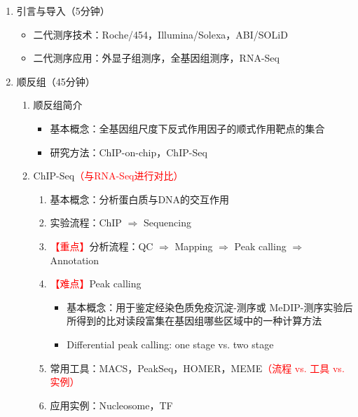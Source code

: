\documentclass{TIJMUjiaoanLL}
\begin{document}
\begin{enumerate}
  \item 引言与导入（5分钟）
    \begin{itemize}
      \item 二代测序技术：Roche/454，Illumina/Solexa，ABI/SOLiD
      \item 二代测序应用：外显子组测序，全基因组测序，RNA-Seq
    \end{itemize}

  \item 顺反组（45分钟）
    \begin{enumerate}
      \item 顺反组简介
        \begin{itemize}
          \item 基本概念：全基因组尺度下反式作用因子的顺式作用靶点的集合
          \item 研究方法：ChIP-on-chip，ChIP-Seq
        \end{itemize}
      \item ChIP-Seq\textcolor{red}{（与RNA-Seq进行对比）}
        \begin{enumerate}
          \item 基本概念：分析蛋白质与DNA的交互作用
          \item 实验流程：ChIP $\Rightarrow$ Sequencing
          \item \textcolor{red}{【重点】}分析流程：QC $\Rightarrow$ Mapping $\Rightarrow$ Peak calling $\Rightarrow$ Annotation
          \item \textcolor{red}{【难点】}Peak calling
            \begin{itemize}
              \item 基本概念：用于鉴定经染色质免疫沉淀-测序或 MeDIP-测序实验后所得到的比对读段富集在基因组哪些区域中的一种计算方法
              \item Differential peak calling: one stage vs. two stage
            \end{itemize}
          \item 常用工具：MACS，PeakSeq，HOMER，MEME\textcolor{red}{（流程 vs. 工具 vs. 实例）}
          \item 应用实例：Nucleosome，TF
        \end{enumerate}
    \end{enumerate}


\end{enumerate}
\end{document}
